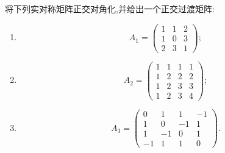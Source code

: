 \begin{example}
将下列实对称矩阵正交对角化,并给出一个正交过渡矩阵:
\begin{enumerate}
    \item
    \[
    A_1=
    \begin{pmatrix}
    1&1&2\\
    1&0&3\\
    2&3&1
    \end{pmatrix};
    \]
    \item
    \[
    A_2=
    \begin{pmatrix}
    1&1&1&1\\
    1&2&2&2\\
    1&2&3&3\\
    1&2&3&4
    \end{pmatrix};
    \]
    \item
    \[
    A_3=
    \begin{pmatrix}
    0&1&1&-1\\
    1&0&-1&1\\
    1&-1&0&1\\
    -1&1&1&0
    \end{pmatrix}.
    \]
\end{enumerate}
\end{example}
\exampleblank

